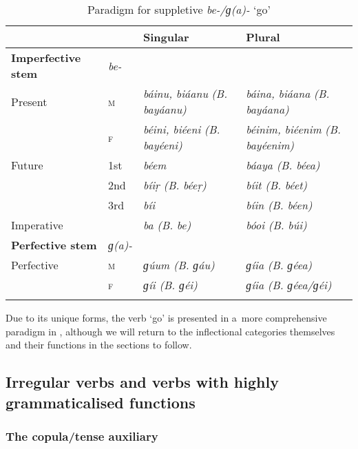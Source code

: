 \begin{table}[ht]
\caption{Paradigm for suppletive \textit{be-/ɡ(a)-} `go'}

\begin{tabularx}{\textwidth}{ l@{\hspace{20pt}} l@{\hspace{20pt}} Q Q }
\lsptoprule
&
&
Singular &
Plural\\\hline
\textbf{Imperfective stem} &
\textit{be-} &
&
\\
Present &
\textsc{m} &
\textit{báinu, biáanu}\newline
\textit{(B. bayáanu)} &
\textit{báina, biáana}\newline
\textit{(B. bayáana)}\\
&
\textsc{f} &
\textit{béini, biéeni} \newline
\textit{(B. bayéeni)} &
\textit{béinim, biéenim} \newline
\textit{(B. bayéenim)}\\
Future &
1st &
\textit{béem} &
\textit{báaya (B. béea)}\\
&
2nd &
\textit{bíiṛ (B. béeṛ)} &
\textit{bíit (B. béet)}\\
&
3rd &
\textit{bíi} &
\textit{bíin (B. béen)}\\
Imperative &
&
\textit{ba (B. be)} &
\textit{bóoi (B. búi)}\\
\textbf{Perfective stem} &
\textit{ɡ(a)-} &
&
\\
Perfective &
\textsc{m} &
\textit{ɡúum (B. ɡáu)} &
\textit{ɡíia (B. ɡéea)}\\
&
\textsc{f} &
\textit{ɡíi (B. ɡéi)} &
\textit{ɡíia (B. ɡéea/ɡéi)}\\\lspbottomrule
\end{tabularx}
\label{tab:8-13}
\end{table}

Due to its unique forms, the verb `go' is presented in a~more comprehensive paradigm in , although we will return to the inflectional categories themselves and their functions in the sections to follow.

\subsection{Irregular verbs and verbs with highly grammaticalised functions}
\label{subsec:8-3-12}

\subsubsection*{The copula/tense auxiliary}


